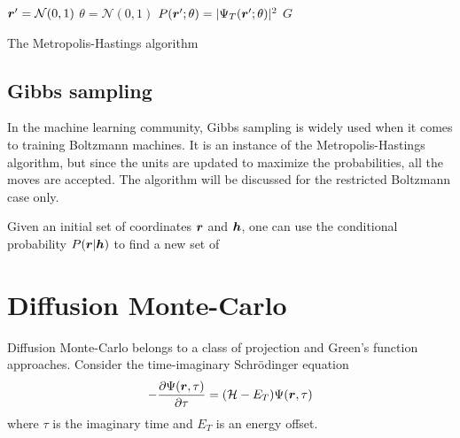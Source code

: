 \begin{algorithm}
	\SetAlgoLined
	$\boldsymbol{{r}}'=\mathcal{N}(0,1)$\;
	$\theta=\mathcal{N}(0,1)$\;
	$P(\boldsymbol{{r}}';\theta)=|\Psi_T(\boldsymbol{{r}}';\theta)|^2$\;
	$G$\;
	\caption{The Metropolis-Hastings algorithm}
	\label{al:hasting}
\end{algorithm}

\subsection{Gibbs sampling}
In the machine learning community, Gibbs sampling is widely used when it comes to training Boltzmann machines. It is an instance of the Metropolis-Hastings algorithm, but since the units are updated to maximize the probabilities, all the moves are accepted. The algorithm will be discussed for the restricted Boltzmann case only.

Given an initial set of coordinates $\boldsymbol{{r}}$ and $\boldsymbol{{h}}$, one can use the conditional probability $P(\boldsymbol{{r}}|\boldsymbol{{h}})$ to find a new set of 

\section{Diffusion Monte-Carlo}
Diffusion Monte-Carlo belongs to a class of projection and Green's function approaches. Consider the time-imaginary Schrödinger equation
\begin{eqnarray}
-\frac{\partial\Psi(\boldsymbol{{r}},\tau)}{\partial\tau}=(\mathcal{H}-E_T)\Psi(\boldsymbol{{r}},\tau)
\end{eqnarray}
where $\tau$ is the imaginary time and $E_T$ is an energy offset. 
